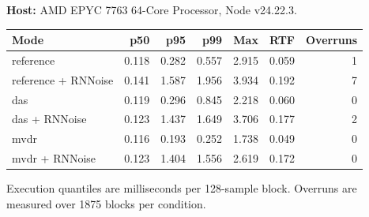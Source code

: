 \textbf{Host:} AMD EPYC 7763 64-Core Processor, Node v24.22.3.\par
\begin{center}\small\begin{tabular}{@{}lrrrrrr@{}}\toprule Mode & p50 & p95 & p99 & Max & RTF & Overruns\\\midrule
reference  & 0.118 & 0.282 & 0.557 & 2.915 & 0.059 & 1 \\
reference + RNNoise & 0.141 & 1.587 & 1.956 & 3.934 & 0.192 & 7 \\
das  & 0.119 & 0.296 & 0.845 & 2.218 & 0.060 & 0 \\
das + RNNoise & 0.123 & 1.437 & 1.649 & 3.706 & 0.177 & 2 \\
mvdr  & 0.116 & 0.193 & 0.252 & 1.738 & 0.049 & 0 \\
mvdr + RNNoise & 0.123 & 1.404 & 1.556 & 2.619 & 0.172 & 0 \\\bottomrule\end{tabular}\end{center}
Execution quantiles are milliseconds per 128-sample block. Overruns are measured over 1875 blocks per condition.

